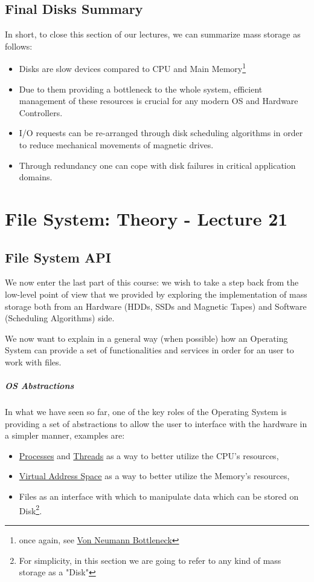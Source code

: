 \documentclass[openright, twoside]{report}
\theoremstyle{definition}
\theoremstyle{example}
\begin{document}
\section{Final Disks Summary}
In short, to close this section of our lectures, we can summarize mass storage as follows:

\begin{itemize}
	\item Disks are slow devices compared to CPU and 
	Main Memory\footnote{
		once again, see \href{https://en.wikipedia.org/wiki/Von_Neumann_architecture\#Von_Neumann_bottleneck}{Von Neumann Bottleneck}
		}
	\item Due to them providing a bottleneck to the whole system, efficient management of these 
	resources is crucial for any modern OS and Hardware Controllers.
	\item I/O requests can be re-arranged through disk scheduling algorithms in order to 
	reduce mechanical movements of magnetic drives.
	\item Through redundancy one can cope with disk failures in critical application domains.
\end{itemize}

\chapter{File System: Theory - Lecture 21}
\section{File System API}
We now enter the last part of this course: we wish to take a step back from the low-level 
point of view that we provided by exploring the implementation of mass storage both from an 
Hardware (HDDs, SSDs and Magnetic Tapes) and Software (Scheduling Algorithms) side.

We now want to explain in a general way (when possible) how an Operating System can provide a set of 
functionalities and services in order for an user to work with files.

\paragraph{OS Abstractions}
In what we have seen so far, one of the key roles of the Operating System is providing a set 
of abstractions to allow the user to interface with the hardware in a simpler manner, examples are: 

\begin{itemize}
	\item \hyperref[ssec:proc]{Processes} and \hyperref[sec:threads]{Threads} as a way to better utilize the CPU's resources,
	\item \hyperref[sec:vmem]{Virtual Address Space} as a way to better utilize the Memory's resources,
	\item Files as an interface with which to manipulate data which can be stored on Disk\footnote{For simplicity, in this section we 
	are going to refer to any kind of mass storage as a "Disk"}.
\end{itemize}
\end{document}
